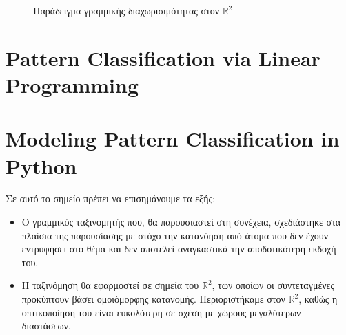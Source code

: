 \documentclass[12pt]{article}
\newcommand{\R}{\mathbb{R}}
\begin{document}
\begin{figure}[hp]
    \centering
    \qquad
    \caption{Παράδειγμα γραμμικής διαχωρισιμότητας στον \( \R^2 \)}
\end{figure}

\pagebreak

\section{Pattern Classification via Linear Programming}


\pagebreak

\section{Modeling Pattern Classification in Python}

Σε αυτό το σημείο πρέπει να επισημάνουμε τα εξής: \\

\begin{itemize}
    \item Ο γραμμικός ταξινομητής που, θα παρουσιαστεί στη συνέχεια,
    σχεδιάστηκε στα πλαίσια της παρουσίασης με στόχο την κατανόηση
    από άτομα που δεν έχουν εντρυφήσει στο θέμα και δεν αποτελεί αναγκαστικά
    την αποδοτικότερη εκδοχή του. \\

    \item Η ταξινόμηση θα εφαρμοστεί σε σημεία του \( \R^2 \),
    των οποίων οι συντεταγμένες προκύπτουν βάσει ομοιόμορφης κατανομής.
    Περιοριστήκαμε στον \( \R^2 \), καθώς η οπτικοποίηση του είναι ευκολότερη
    σε σχέση με χώρους μεγαλύτερων διαστάσεων. \\
\end{itemize}
\end{document}

